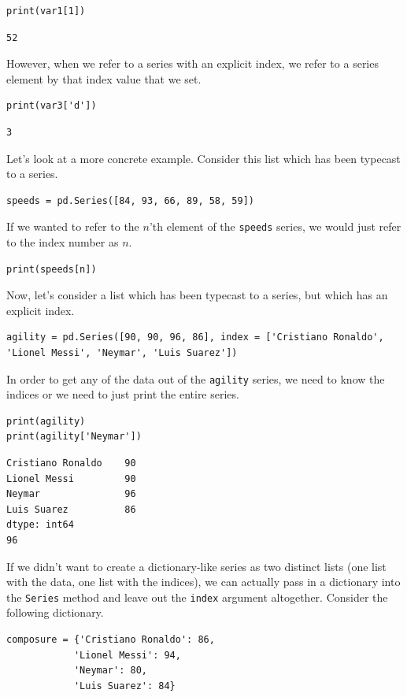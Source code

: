 \begin{lstlisting}[style=pippython]
print(var1[1])
\end{lstlisting}
\begin{lstlisting}
52
\end{lstlisting}
However, when we refer to a series with an explicit index, we refer to a series element by that index value that we set.
\begin{lstlisting}[style=pippython]
print(var3['d'])
\end{lstlisting}
\begin{lstlisting}
3
\end{lstlisting}
Let's look at a more concrete example. Consider this list which has been typecast to a series.
\begin{lstlisting}[style=pippython]
speeds = pd.Series([84, 93, 66, 89, 58, 59])
\end{lstlisting}
If we wanted to refer to the $n$'th element of the \verb|speeds| series, we would just refer to the index number as $n$.
\begin{lstlisting}[style=pippython]
print(speeds[n])
\end{lstlisting}
Now, let's consider a list which has been typecast to a series, but which has an explicit index.
\begin{lstlisting}[style=pippython]
agility = pd.Series([90, 90, 96, 86], index = ['Cristiano Ronaldo', 'Lionel Messi', 'Neymar', 'Luis Suarez'])
\end{lstlisting}
In order to get any of the data out of the \verb|agility| series, we need to know the indices or we need to just print the entire series.
\begin{lstlisting}[style=pippython]
print(agility)
print(agility['Neymar'])
\end{lstlisting}
\begin{lstlisting}
Cristiano Ronaldo    90
Lionel Messi         90
Neymar               96
Luis Suarez          86
dtype: int64
96
\end{lstlisting}
If we didn't want to create a dictionary-like series as two distinct lists (one list with the data, one list with the indices), we can actually pass in a dictionary into the \verb|Series| method and leave out the \verb|index| argument altogether. Consider the following dictionary.
\begin{lstlisting}[style=pippython]
composure = {'Cristiano Ronaldo': 86,
            'Lionel Messi': 94,
            'Neymar': 80,
            'Luis Suarez': 84}
\end{lstlisting}
